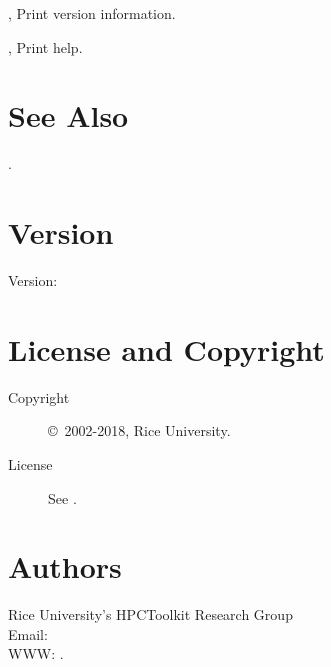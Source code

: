 \documentclass[english]{article}
\begin{document}
\begin{Description}
\item[\Opt{-V}, \Opt{--version}] Print version information.
\item[\Opt{-h}, \Opt{--help}] Print help.
\end{Description}


\section{See Also}

.

\section{Version}

Version: \Version

\section{License and Copyright}

\begin{description}
\item[Copyright] \copyright\ 2002-2018, Rice University.
\item[License] See .
\end{description}

\section{Authors}

\noindent
Rice University's HPCToolkit Research Group \\
Email:  \\
WWW: .

\LatexManEnd
\end{document}
